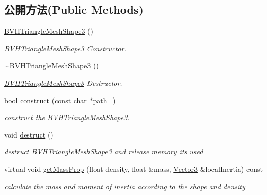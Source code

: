 \subsection*{公開方法(Public Methods)}
\begin{DoxyCompactItemize}
\item 
\hyperlink{class_i_dream_sky_1_1_b_v_h_triangle_mesh_shape3_a1043d44338ada951f5ec43eeddd00631}{B\+V\+H\+Triangle\+Mesh\+Shape3} ()
\begin{DoxyCompactList}\small\item\em \hyperlink{class_i_dream_sky_1_1_b_v_h_triangle_mesh_shape3}{B\+V\+H\+Triangle\+Mesh\+Shape3} Constructor. \end{DoxyCompactList}\item 
\hyperlink{class_i_dream_sky_1_1_b_v_h_triangle_mesh_shape3_a3399a419d84e28c1ce6f75d30c9fd256}{$\sim$\+B\+V\+H\+Triangle\+Mesh\+Shape3} ()
\begin{DoxyCompactList}\small\item\em \hyperlink{class_i_dream_sky_1_1_b_v_h_triangle_mesh_shape3}{B\+V\+H\+Triangle\+Mesh\+Shape3} Destructor. \end{DoxyCompactList}\item 
bool \hyperlink{class_i_dream_sky_1_1_b_v_h_triangle_mesh_shape3_aad17f2c23b7601f7b9443b9a40a73595}{construct} (const char $\ast$path\+\_\+)
\begin{DoxyCompactList}\small\item\em construct the \hyperlink{class_i_dream_sky_1_1_b_v_h_triangle_mesh_shape3}{B\+V\+H\+Triangle\+Mesh\+Shape3}. \end{DoxyCompactList}\item 
void \hyperlink{class_i_dream_sky_1_1_b_v_h_triangle_mesh_shape3_a8a810bc16558b9a6bdd1d506122a8db6}{destruct} ()\hypertarget{class_i_dream_sky_1_1_b_v_h_triangle_mesh_shape3_a8a810bc16558b9a6bdd1d506122a8db6}{}\label{class_i_dream_sky_1_1_b_v_h_triangle_mesh_shape3_a8a810bc16558b9a6bdd1d506122a8db6}

\begin{DoxyCompactList}\small\item\em destruct \hyperlink{class_i_dream_sky_1_1_b_v_h_triangle_mesh_shape3}{B\+V\+H\+Triangle\+Mesh\+Shape3} and release memory its used \end{DoxyCompactList}\item 
virtual void \hyperlink{class_i_dream_sky_1_1_b_v_h_triangle_mesh_shape3_af1c3589b58094e8a79e5b3fe00b4b101}{get\+Mass\+Prop} (float density, float \&mass, \hyperlink{class_i_dream_sky_1_1_vector3}{Vector3} \&local\+Inertia) const 
\begin{DoxyCompactList}\small\item\em calculate the mass and moment of inertia according to the shape and density \end{DoxyCompactList}\end{DoxyCompactItemize}
